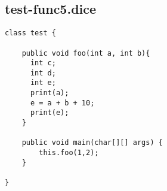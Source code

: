 \subsection{test-func5.dice}
\begin{verbatim}
class test {

	public void foo(int a, int b){
	  int c;
	  int d;
	  int e;
	  print(a);
	  e = a + b + 10;
	  print(e);
	}
	
	public void main(char[][] args) {
  		this.foo(1,2);
	}

}

\end{verbatim}